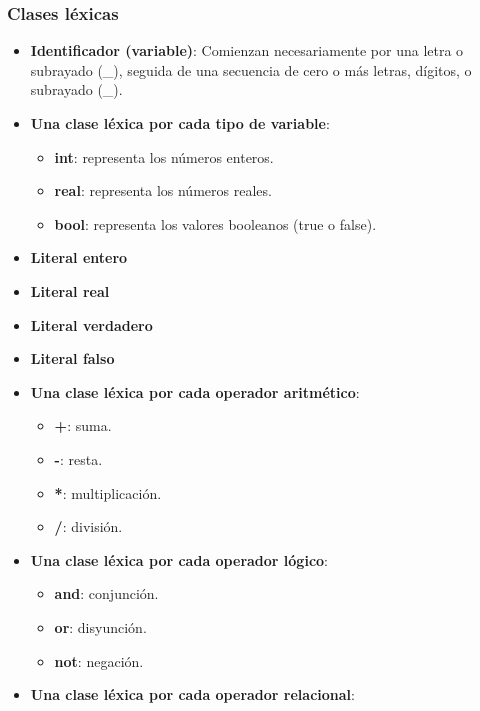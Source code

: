 \documentclass[11pt]{article}
\begin{document}
        \subsubsection*{Clases léxicas}
        \begin{itemize}
            \item \textbf{Identificador (variable)}: Comienzan necesariamente por una letra o subrayado (\_), seguida de una secuencia de cero o más letras, dígitos, o subrayado (\_).
            \item \textbf{Una clase léxica por cada tipo de variable}:
                \begin{itemize}
                    \item \textbf{int}: representa los números enteros.
                    \item \textbf{real}: representa los números reales.
                    \item \textbf{bool}: representa los valores booleanos (true o false).
                \end{itemize}
            \item \textbf{Literal entero}
            \item \textbf{Literal real}
            \item \textbf{Literal verdadero}
            \item \textbf{Literal falso}
            \item \textbf{Una clase léxica por cada operador aritmético}:
                \begin{itemize}
                    \item \textbf{+}: suma.
                    \item \textbf{-}: resta.
                    \item \textbf{*}: multiplicación.
                    \item \textbf{/}: división.
                \end{itemize}
            \item \textbf{Una clase léxica por cada operador lógico}:
                \begin{itemize}
                    \item \textbf{and}: conjunción.
                    \item \textbf{or}: disyunción.
                    \item \textbf{not}: negación.
                \end{itemize}
            \item \textbf{Una clase léxica por cada operador relacional}:

\end{itemize}
\end{document}
